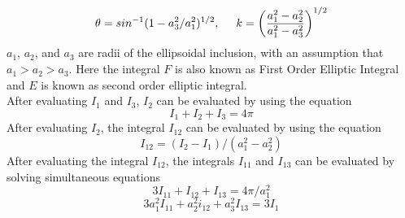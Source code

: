\documentclass[12pt, a4paper]{report}
\begin{document}
\begin{equation}
    \theta = sin^{-1}( 1 - a_{3}^{2}/a_{1}^{2})^{1/2} ,\hspace{5mm}  k = \left(\frac{a_{1}^{2} - a_{2}^{2}}{a_{1}^{2} - a_{3}^{2}}\right) ^{1/2}
\end{equation}
$a_1$, $a_2$, and $a_3$ are radii of the ellipsoidal inclusion, with an assumption that $a_1 > a_2 > a_3$. Here the integral $F$ is also known as First Order Elliptic Integral and $E$ is known as second order elliptic integral.\\

After evaluating $I_1$ and $I_3$, $I_2$ can be evaluated by using the equation
\begin{equation}
    I_1 + I_2 + I_3 = 4\pi
\end{equation}
After evaluating $I_2$, the integral $I_{12}$ can be evaluated by using the equation
\begin{equation}
    I_{12} = (I_2 - I_1)/(a_{1}^{2} - a_{2}^{2})
\end{equation}
After evaluating the integral $I_{12}$, the integrals $I_{11}$ and $I_{13}$ can be evaluated by solving simultaneous equations
\begin{equation}
    3I_{11} + I_{12} + I_{13} = 4\pi /a_{1}^{2}
\end{equation}
\begin{equation}
    3a_{1}^{2}I_{11} + a_{2}^{2}i_{12} + a_{3}^{2}I_{13} = 3I_1
\end{equation}
\end{document}

